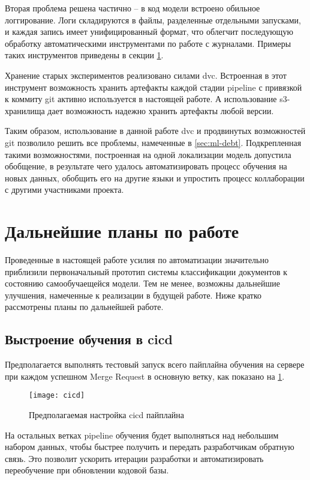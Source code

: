 Вторая проблема решена частично -- в код модели встроено обильное логгирование.
Логи складируются в файлы, разделенные отдельными запусками, и каждая запись имеет унифицированный формат, что облегчит последующую обработку автоматическими инструментами по работе с журналами.
Примеры таких инструментов приведены в секции \ref{sec:future}.

Хранение старых экспериментов реализовано силами \gls{dvc}.
Встроенная в этот инструмент возможность хранить артефакты каждой стадии \gls{pipeline} с привязкой к коммиту \gls{git} активно используется в настоящей работе.
А использование \gls{s3}-хранилища дает возможность надежно хранить артефакты любой версии.

Таким образом, использование в данной работе \gls{dvc} и продвинутых возможностей \gls{git} позволило решить все проблемы, намеченные в \ref{sec:ml-debt}.
Подкрепленная такими возможностями, построенная на одной локализации модель допустила обобщение, в результате чего удалось автоматизировать процесс обучения на новых данных, обобщить его на другие языки и упростить процесс коллаборации с другими участниками проекта.
\section{Дальнейшие планы по работе}
\label{sec:future}
Проведенные в настоящей работе усилия по автоматизации значительно приблизили первоначальный прототип системы классификации документов к состоянию самообучаещейся модели.
Тем не менее, возможны дальнейшие улучшения, намеченные к реализации в будущей работе.
Ниже кратко рассмотрены планы по дальнейшей работе.
    \subsection{Выстроение обучения в \gls{cicd}}
    Предполагается выполнять тестовый запуск всего пайплайна обучения на сервере при каждом успешном Merge Request в основную ветку, как показано на \ref{fig:cicd}.
    \begin{figure}[h]
        \centering
        \texttt{[image: cicd]}
        \caption{Предполагаемая настройка \gls{cicd} пайплайна}
        \label{fig:cicd}
    \end{figure}
    На остальных ветках \gls{pipeline} обучения будет выполняться над небольшим набором данных, чтобы быстрее получить и передать разработчикам обратную связь.
    Это позволит ускорить итерации разработки и автоматизировать переобучение при обновлении кодовой базы.

